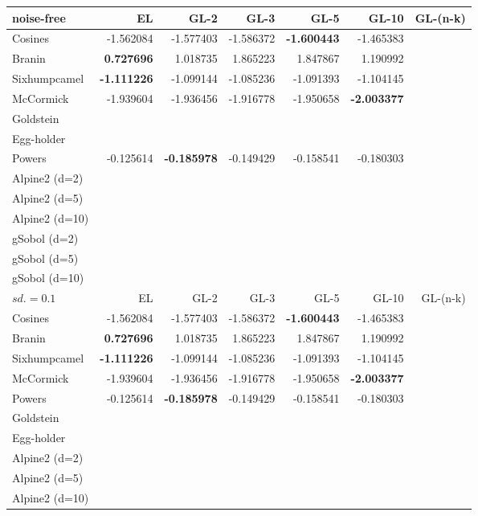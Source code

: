 \documentclass[twoside]{article}
\begin{document}
\begin{table*}[t!]
\begin{center}
\begin{tabular}{lrrrrrr}
\toprule
     noise-free &        EL &      GL-2 &      GL-3 &      GL-5 &     GL-10 & GL-(n-k) \\
\midrule
      Cosines & -1.562084 & -1.577403 & -1.586372 & \textbf{-1.600443} & -1.465383 &\\
       Branin &  \textbf{0.727696} &  1.018735 &  1.865223 &  1.847867 &  1.190992 & \\
 Sixhumpcamel & \textbf{-1.111226} & -1.099144 & -1.085236 & -1.091393 & -1.104145 & \\
    McCormick & -1.939604 & -1.936456 & -1.916778 & -1.950658 & \textbf{-2.003377} & \\
       Goldstein &&&&&\\
       Egg-holder &&&&&\\   
       Powers & -0.125614 & \textbf{-0.185978} & -0.149429 & -0.158541 & -0.180303 & \\
       Alpine2 (d=2) &&&&&\\
       Alpine2 (d=5) &&&&&\\
       Alpine2 (d=10) &&&&&\\
       gSobol (d=2) &&&&&\\
       gSobol (d=5) &&&&&\\
       gSobol (d=10) &&&&&\\
\bottomrule
\toprule
     $sd.=0.1 $ &        EL &      GL-2 &      GL-3 &      GL-5 &     GL-10 & GL-(n-k) \\
\midrule
      Cosines & -1.562084 & -1.577403 & -1.586372 & \textbf{-1.600443} & -1.465383 &\\
       Branin &  \textbf{0.727696} &  1.018735 &  1.865223 &  1.847867 &  1.190992 & \\
 Sixhumpcamel & \textbf{-1.111226} & -1.099144 & -1.085236 & -1.091393 & -1.104145 & \\
    McCormick & -1.939604 & -1.936456 & -1.916778 & -1.950658 & \textbf{-2.003377} & \\
       Powers & -0.125614 & \textbf{-0.185978} & -0.149429 & -0.158541 & -0.180303 & \\
              Goldstein &&&&&\\
       Egg-holder &&&&&\\   
       Alpine2 (d=2) &&&&&\\
       Alpine2 (d=5) &&&&&\\
       Alpine2 (d=10) &&&&&\\

\end{tabular}
\end{center}
\end{table*}
\end{document}
